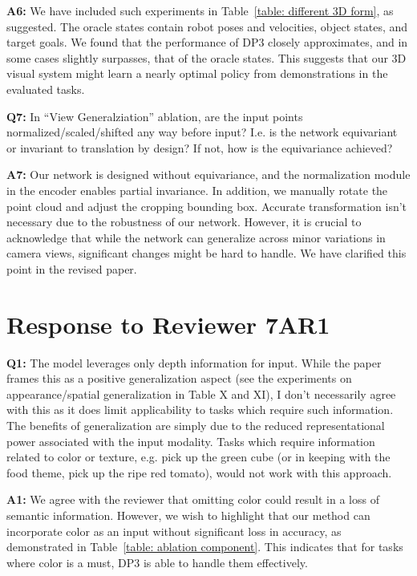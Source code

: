 \noindent\textbf{A6:} We have included such experiments in Table~\ref{table: different 3D form}, as suggested. The oracle states contain robot poses and velocities, object states, and target goals. We found that the performance of DP3 closely approximates, and in some cases slightly surpasses, that of the oracle states. This suggests that our 3D visual system might learn a nearly optimal policy from demonstrations in the evaluated tasks.

\vspace{0.1in}

\noindent\textbf{Q7:} In “View Generalziation” ablation, are the input points normalized/scaled/shifted any way before input? I.e. is the network equivariant or invariant to translation by design? If not, how is the equivariance achieved?

\noindent\textbf{A7:}  Our network is designed without equivariance, and the normalization module in the encoder enables partial invariance. In addition, we manually rotate the point cloud and adjust the cropping bounding box. Accurate transformation isn't necessary due to the robustness of our network. However, it is crucial to acknowledge that while the network can generalize across minor variations in camera views, significant changes might be hard to handle. We have clarified this point in the revised paper.



\section*{Response to Reviewer 7AR1}

\noindent\textbf{Q1:} The model leverages only depth information for input. While the paper frames this as a positive generalization aspect (see the experiments on appearance/spatial generalization in Table X and XI), I don't necessarily agree with this as it does limit applicability to tasks which require such information. The benefits of generalization are simply due to the reduced representational power associated with the input modality. Tasks which require information related to color or texture, e.g. pick up the green cube (or in keeping with the food theme, pick up the ripe red tomato), would not work with this approach.

\noindent\textbf{A1:} 
We agree with the reviewer that omitting color could result in a loss of semantic information. However, we wish to highlight that our method can incorporate color as an input without significant loss in accuracy, as demonstrated in Table~\ref{table: ablation component}. This indicates that for tasks where color is a must, DP3 is able to handle them effectively.


